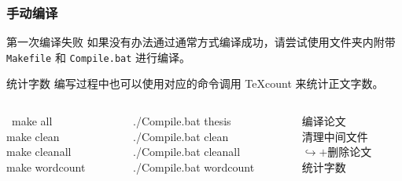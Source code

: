 \begin{frame}
  \frametitle{手动编译}
  \alert{第一次编译失败} 如果没有办法通过通常方式编译成功，请尝试使用文件夹内附带 \faLinux{}\,\faApple{} \texttt{Makefile} 和 \faWindows{} \texttt{Compile.bat} 进行编译。

  \alert{统计字数} 编写过程中也可以使用对应的命令调用 \TeX{}count 来统计正文字数。
  \begin{columns}
    \begin{column}{0.38\textwidth}
      \begin{exampleblock}{\faLinux{}\,\faApple}
        \ttfamily
        make all\\
        make clean\\
        make cleanall\\
        make wordcount
      \end{exampleblock}
    \end{column}
    \begin{column}{0.38\textwidth}
      \begin{exampleblock}{\faWindows}
        \ttfamily
        ./Compile.bat thesis\\
        ./Compile.bat clean\\
        ./Compile.bat cleanall\\
        ./Compile.bat wordcount
      \end{exampleblock}
    \end{column}
    \begin{column}{0.24\textwidth}
      \begin{block}{\faInfo}
        \ttfamily
        编译论文\\
        清理中间文件\\
        $\hookrightarrow +$删除论文\\
        统计字数
      \end{block}
    \end{column}
  \end{columns}
\end{frame}

